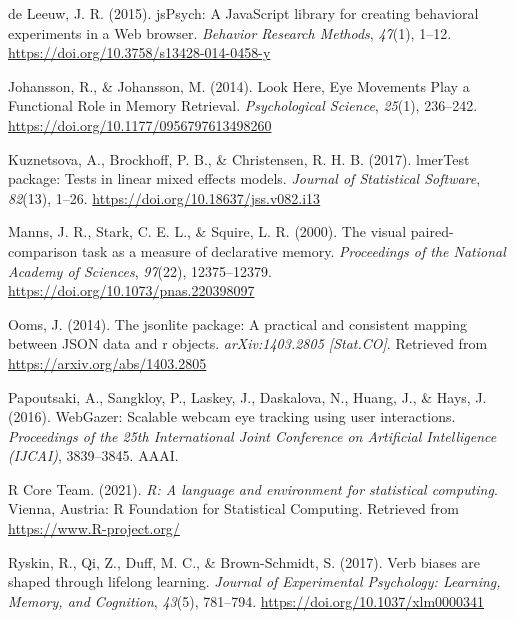 \documentclass[
  man,floatsintext]{apa6}
\newlength{\cslhangindent}
\newlength{\cslentryspacingunit} %
\newenvironment{CSLReferences}[2] %
 {%
  \setlength{\parindent}{0pt}
  \ifodd #1
  \let\oldpar\par
  \def\par{\hangindent=\cslhangindent\oldpar}
  \fi
  \setlength{\parskip}{#2\cslentryspacingunit}
 }%
 {}
\begin{document}
\begin{CSLReferences}{1}{0}
\leavevmode{}%
de Leeuw, J. R. (2015). {jsPsych}: {A JavaScript} library for creating behavioral experiments in a {Web} browser. \emph{Behavior Research Methods}, \emph{47}(1), 1--12. \url{https://doi.org/10.3758/s13428-014-0458-y}

\leavevmode{}%
Johansson, R., \& Johansson, M. (2014). Look {Here}, {Eye Movements Play} a {Functional Role} in {Memory Retrieval}. \emph{Psychological Science}, \emph{25}(1), 236--242. \url{https://doi.org/10.1177/0956797613498260}

\leavevmode{}%
Kuznetsova, A., Brockhoff, P. B., \& Christensen, R. H. B. (2017). {lmerTest} package: Tests in linear mixed effects models. \emph{Journal of Statistical Software}, \emph{82}(13), 1--26. \url{https://doi.org/10.18637/jss.v082.i13}

\leavevmode{}%
Manns, J. R., Stark, C. E. L., \& Squire, L. R. (2000). The visual paired-comparison task as a measure of declarative memory. \emph{Proceedings of the National Academy of Sciences}, \emph{97}(22), 12375--12379. \url{https://doi.org/10.1073/pnas.220398097}

\leavevmode{}%
Ooms, J. (2014). The jsonlite package: A practical and consistent mapping between JSON data and r objects. \emph{arXiv:1403.2805 {[}Stat.CO{]}}. Retrieved from \url{https://arxiv.org/abs/1403.2805}

\leavevmode{}%
Papoutsaki, A., Sangkloy, P., Laskey, J., Daskalova, N., Huang, J., \& Hays, J. (2016). {WebGazer}: {Scalable} webcam eye tracking using user interactions. \emph{Proceedings of the 25th International Joint Conference on Artificial Intelligence ({IJCAI})}, 3839--3845. {AAAI}.

\leavevmode{}%
R Core Team. (2021). \emph{R: A language and environment for statistical computing}. Vienna, Austria: R Foundation for Statistical Computing. Retrieved from \url{https://www.R-project.org/}

\leavevmode{}%
Ryskin, R., Qi, Z., Duff, M. C., \& Brown-Schmidt, S. (2017). Verb biases are shaped through lifelong learning. \emph{Journal of Experimental Psychology: Learning, Memory, and Cognition}, \emph{43}(5), 781--794. \url{https://doi.org/10.1037/xlm0000341}


\end{CSLReferences}
\end{document}
